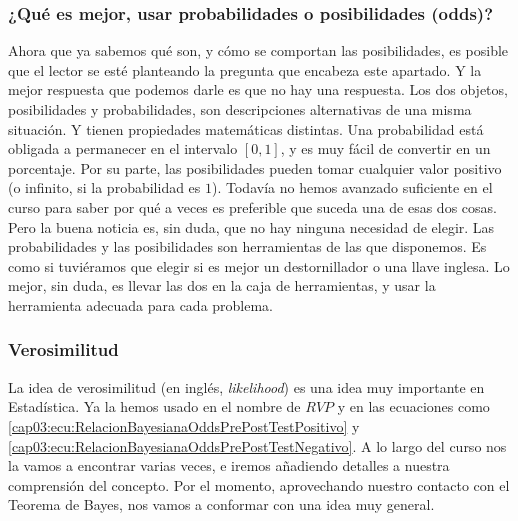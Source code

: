\subsubsection{¿Qué es mejor, usar probabilidades o posibilidades (odds)?}
\label{cap03:subsubsec:QueEsMejorPosibilidadesProabilidades}

Ahora que ya sabemos qué son, y cómo se comportan las posibilidades, es posible que el lector se esté planteando la pregunta que encabeza este apartado. Y la mejor respuesta que podemos darle es que no hay una respuesta. Los dos objetos, posibilidades y probabilidades, son descripciones alternativas de una misma situación. Y tienen propiedades matemáticas distintas. Una probabilidad está obligada a permanecer en el intervalo $[0,1]$, y es muy fácil de convertir en un porcentaje. Por su parte, las posibilidades pueden tomar cualquier valor positivo (o infinito, si la probabilidad es $1$). Todavía no hemos avanzado suficiente en el curso para saber por qué a veces es preferible que suceda una de esas dos cosas. Pero la buena noticia es, sin duda, que no hay ninguna necesidad de elegir. Las probabilidades y las posibilidades son herramientas de las que disponemos. Es como si tuviéramos que elegir si es mejor un destornillador o una llave inglesa. Lo mejor, sin duda, es llevar las dos en la caja de herramientas, y usar la herramienta adecuada para cada problema.

\subsubsection{Verosimilitud}
\label{cap03:subsubsec:verosimilitud}

La idea de {\sf verosimilitud} (en inglés, {\em likelihood}) es una idea muy importante en Estadística. Ya la hemos usado en el nombre de $RVP$ y en las ecuaciones como \ref{cap03:ecu:RelacionBayesianaOddsPrePostTestPositivo} y \ref{cap03:ecu:RelacionBayesianaOddsPrePostTestNegativo}.  A lo largo del curso nos la vamos a encontrar varias veces, e iremos añadiendo detalles a nuestra comprensión del concepto. Por el momento, aprovechando nuestro contacto con el Teorema de Bayes, nos vamos a conformar con una idea muy general.

